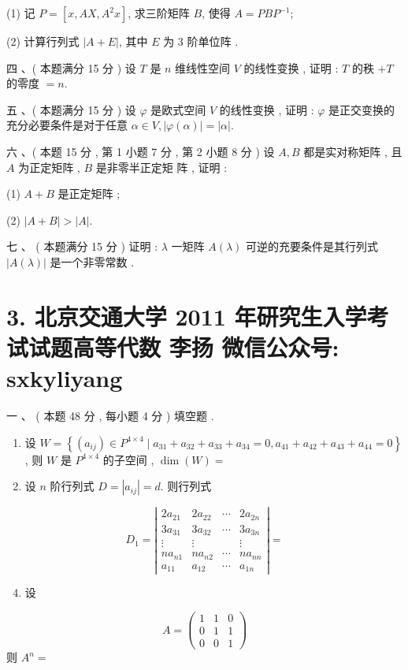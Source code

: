 \documentclass[10pt]{article}
\begin{document}
{(1)  记  $P=\left[x, A X, A^{2} x\right]$,  求三阶矩阵  $B$,  使得  $A=P B P^{-1}$;

(2)  计算行列式  $|A+E|$,  其中  $E$  为  3  阶单位阵 .

 四 、( 本题满分  15  分 )  设  $T$  是  $n$  维线性空间  $V$  的线性变换 ,  证明 : $T$  的秩  $+T$  的零度  $=n$.

 五 、( 本题满分  15  分 )  设  $\varphi$  是欧式空间  $V$  的线性变换 ,  证明 : $\varphi$  是正交变换的充分必要条件是对于任意  $\alpha \in V,|\varphi(\alpha)|=|\alpha|$.

 六 、( 本题  15  分 ,  第  1  小题  7  分 ,  第  2  小题  8  分 )  设  $A, B$  都是实对称矩阵 ,  且  $A$  为正定矩阵 , $B$  是非零半正定矩   阵 ,  证明 :

(1) $A+B$  是正定矩阵 ;

(2) $|A+B|>|A|$.

 七 、 ( 本题满分  15  分 )  证明 : $\lambda$  一矩阵  $A(\lambda)$  可逆的充要条件是其行列式  $|A(\lambda)|$  是一个非零常数 .

\section{3. 北京交通大学 2011 年研究生入学考试试题高等代数 
 李扬 
 微信公众号: sxkyliyang}
 一 、 ( 本题  48  分 ,  每小题  4  分 )  填空题 .

\begin{enumerate}
  \item  设  $W=\left\{\left(a_{i j}\right) \in P^{4 \times 4} \mid a_{31}+a_{32}+a_{33}+a_{34}=0, a_{41}+a_{42}+a_{43}+a_{44}=0\right\}$,  则  $W$  是  $P^{4 \times 4}$  的子空间 , $\operatorname{dim}(W)=$

  \item  设  $n$  阶行列式  $D=\left|a_{i j}\right|=d$.  则行列式 

\end{enumerate}
$$
D_{1}=\left|\begin{array}{cccc}
2 a_{21} & 2 a_{22} & \cdots & 2 a_{2 n} \\
3 a_{31} & 3 a_{32} & \cdots & 3 a_{3 n} \\
\vdots & \vdots & & \vdots \\
n a_{n 1} & n a_{n 2} & \cdots & n a_{n n} \\
a_{11} & a_{12} & \cdots & a_{1 n}
\end{array}\right|=
$$

\begin{enumerate}
  \setcounter{enumi}{3}
  \item  设 
\end{enumerate}
$$
A=\left(\begin{array}{lll}
1 & 1 & 0 \\
0 & 1 & 1 \\
0 & 0 & 1
\end{array}\right)
$$
 则  $A^{n}=$

}
\end{document}
